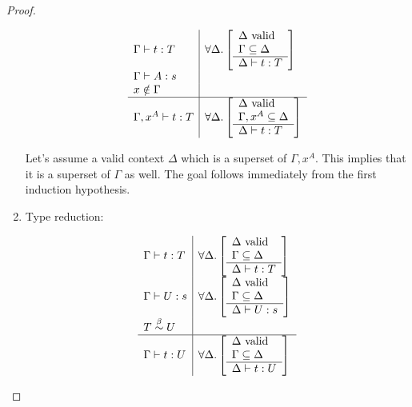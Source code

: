 \begin{theorem}
\begin{proof}
\begin{enumerate}
            $$
            \begin{array}{l|l}
                \Gamma \vdash t : T
                &
                \forall \Delta
                    . \left[\begin{array}{l} 
                        \Delta \text{ valid}
                        \\
                        \Gamma \subseteq \Delta
                     \\ \hline 
                        \Delta \vdash t : T
                    \end{array}\right]
                \\
                \Gamma \vdash A : s
                \\
                x \notin \Gamma
                \\
                \hline
                \Gamma,x^A \vdash t : T
                &
                \forall \Delta
                    . \left[\begin{array}{l} 
                        \Delta \text{ valid}
                        \\
                        \Gamma, x^A \subseteq \Delta
                     \\ \hline 
                        \Delta \vdash t : T
                    \end{array}\right]
            \end{array}
            $$

            Let's assume a valid context $\Delta$ which is a superset of
            $\Gamma,x^A$. This implies that it is a superset of $\Gamma$ as
            well. The goal follows immediately from the first induction
            hypothesis.

        \item Type reduction:

            $$
            \begin{array}{l|l}
                \Gamma \vdash t : T
                &
                \forall \Delta
                    . \left[\begin{array}{l} 
                        \Delta \text{ valid}
                        \\
                        \Gamma \subseteq \Delta
                     \\ \hline 
                        \Delta \vdash t : T
                    \end{array}\right]
                \\
                \Gamma \vdash U : s
                &
                \forall \Delta
                    . \left[\begin{array}{l} 
                        \Delta \text{ valid}
                        \\
                        \Gamma \subseteq \Delta
                     \\ \hline 
                        \Delta \vdash U : s
                    \end{array}\right]
                \\
                T \stackrel{\beta}{\sim} U
                \\
                \hline
                \Gamma \vdash t : U
                &
                \forall \Delta
                    . \left[\begin{array}{l} 
                        \Delta \text{ valid}
                        \\
                        \Gamma \subseteq \Delta
                     \\ \hline 
                        \Delta \vdash t : U
                    \end{array}\right]
            \end{array}
            $$


\end{enumerate}
\end{proof}
\end{theorem}
